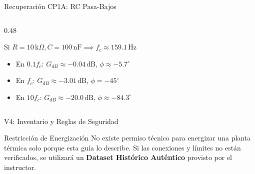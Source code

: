 \documentclass[aspectratio=169, xcolor={table,xcdraw}]{beamer}
\begin{document}
\begin{frame}{Recuperación CP1A: RC Pasa-Bajos}
\begin{columns}[T]
\begin{column}{0.48\textwidth}
            \vspace{0.4cm}
            \begin{tcolorbox}[colback=white, colframe=gray, title=Ejemplo Ilustrativo (No Medido)]
                \scriptsize Si $R=10\,\text{k}\Omega, C=100\,\text{nF} \implies f_c \approx 159.1\,\text{Hz}$
                \begin{itemize}
                    \item En $0.1 f_c$: $G_{dB} \approx -0.04\,\text{dB}$, $\phi \approx -5.7^\circ$
                    \item En $f_c$: $G_{dB} \approx -3.01\,\text{dB}$, $\phi = -45^\circ$
                    \item En $10 f_c$: $G_{dB} \approx -20.0\,\text{dB}$, $\phi \approx -84.3^\circ$
                \end{itemize}
            \end{tcolorbox}
        \end{column}
    \end{columns}
\end{frame}

\begin{frame}{V4: Inventario y Reglas de Seguridad}
    \begin{alertblock}{Restricción de Energización}
        \footnotesize No existe permiso técnico para energizar una planta térmica solo porque esta guía lo describe. Si las conexiones y límites no están verificados, se utilizará un \textbf{Dataset Histórico Auténtico} provisto por el instructor.
    \end{alertblock}
    
    \vspace{0.2cm}
    \begin{center}
    \end{center}
\end{frame}
\end{document}

